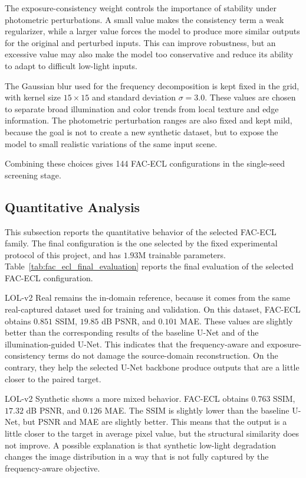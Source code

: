 The exposure-consistency weight controls the importance of stability under photometric perturbations. A small value makes the consistency term a weak regularizer, while a larger value forces the model to produce more similar outputs for the original and perturbed inputs. This can improve robustness, but an excessive value may also make the model too conservative and reduce its ability to adapt to difficult low-light inputs.

The Gaussian blur used for the frequency decomposition is kept fixed in the grid, with kernel size $15 \times 15$ and standard deviation $\sigma = 3.0$. These values are chosen to separate broad illumination and color trends from local texture and edge information. The photometric perturbation ranges are also fixed and kept mild, because the goal is not to create a new synthetic dataset, but to expose the model to small realistic variations of the same input scene.

Combining these choices gives 144 FAC-ECL configurations in the single-seed screening stage.

\subsection{Quantitative Analysis}

This subsection reports the quantitative behavior of the selected FAC-ECL family. The final configuration is the one selected by the fixed experimental protocol of this project, and has $1.93$M trainable parameters. Table~\ref{tab:fac_ecl_final_evaluation} reports the final evaluation of the selected FAC-ECL configuration.



LOL-v2 Real remains the in-domain reference, because it comes from the same real-captured dataset used for training and validation. On this dataset, FAC-ECL obtains $0.851$ SSIM, $19.85$ dB PSNR, and $0.101$ MAE. These values are slightly better than the corresponding results of the baseline U-Net and of the illumination-guided U-Net. This indicates that the frequency-aware and exposure-consistency terms do not damage the source-domain reconstruction. On the contrary, they help the selected U-Net backbone produce outputs that are a little closer to the paired target.

LOL-v2 Synthetic shows a more mixed behavior. FAC-ECL obtains $0.763$ SSIM, $17.32$ dB PSNR, and $0.126$ MAE. The SSIM is slightly lower than the baseline U-Net, but PSNR and MAE are slightly better. This means that the output is a little closer to the target in average pixel value, but the structural similarity does not improve. A possible explanation is that synthetic low-light degradation changes the image distribution in a way that is not fully captured by the frequency-aware objective.

